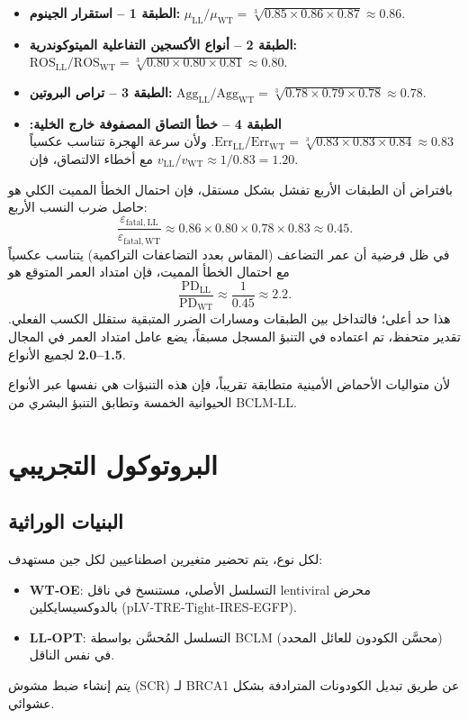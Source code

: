 \documentclass[11pt,a4paper]{article}
\begin{document}
	\begin{itemize}
		\item \textbf{الطبقة 1 – استقرار الجينوم:} \(\mu_{\mathrm{LL}}/\mu_{\mathrm{WT}} = \sqrt[3]{0.85\times0.86\times0.87} \approx 0.86\).
		\item \textbf{الطبقة 2 – أنواع الأكسجين التفاعلية الميتوكوندرية:} \(\mathrm{ROS}_{\mathrm{LL}}/\mathrm{ROS}_{\mathrm{WT}} = \sqrt[3]{0.80\times0.80\times0.81} \approx 0.80\).
		\item \textbf{الطبقة 3 – تراص البروتين:} \(\mathrm{Agg}_{\mathrm{LL}}/\mathrm{Agg}_{\mathrm{WT}} = \sqrt[3]{0.78\times0.79\times0.78} \approx 0.78\).
		\item \textbf{الطبقة 4 – خطأ التصاق المصفوفة خارج الخلية:} \(\mathrm{Err}_{\mathrm{LL}}/\mathrm{Err}_{\mathrm{WT}} = \sqrt[3]{0.83\times0.83\times0.84} \approx 0.83\). ولأن سرعة الهجرة تتناسب عكسياً مع أخطاء الالتصاق، فإن \(v_{\mathrm{LL}}/v_{\mathrm{WT}} \approx 1/0.83 = 1.20\).
	\end{itemize}
	
	بافتراض أن الطبقات الأربع تفشل بشكل مستقل، فإن احتمال الخطأ المميت الكلي هو حاصل ضرب النسب الأربع:
	\[
	\frac{\varepsilon_{\mathrm{fatal,LL}}}{\varepsilon_{\mathrm{fatal,WT}}} \approx 0.86 \times 0.80 \times 0.78 \times 0.83 \approx 0.45.
	\]
	في ظل فرضية أن عمر التضاعف (المقاس بعدد التضاعفات التراكمية) يتناسب عكسياً مع احتمال الخطأ المميت، فإن امتداد العمر المتوقع هو
	\[
	\frac{\mathrm{PD}_{\mathrm{LL}}}{\mathrm{PD}_{\mathrm{WT}}} \approx \frac{1}{0.45} \approx 2.2.
	\]
	هذا حد أعلى؛ فالتداخل بين الطبقات ومسارات الضرر المتبقية ستقلل الكسب الفعلي. تقدير متحفظ، تم اعتماده في التنبؤ المسجل مسبقاً، يضع عامل امتداد العمر في المجال \textbf{1.5–2.0} لجميع الأنواع.
	
	لأن متواليات الأحماض الأمينية متطابقة تقريباً، فإن هذه التنبؤات هي نفسها عبر الأنواع الحيوانية الخمسة وتطابق التنبؤ البشري من BCLM‑LL.
	
	\section{البروتوكول التجريبي}
	\label{sec:protocol}
	
	\subsection{البنيات الوراثية}
	لكل نوع، يتم تحضير متغيرين اصطناعيين لكل جين مستهدف:
	\begin{itemize}
		\item \textbf{WT‑OE}: التسلسل الأصلي، مستنسخ في ناقل lentiviral محرض بالدوكسيسايكلين (pLV‑TRE‑Tight‑IRES‑EGFP).
		\item \textbf{LL‑OPT}: التسلسل المُحسَّن بواسطة BCLM (محسَّن الكودون للعائل المحدد) في نفس الناقل.
	\end{itemize}
	يتم إنشاء ضبط مشوش (SCR) لـ BRCA1 عن طريق تبديل الكودونات المترادفة بشكل عشوائي.
	
\end{document}
